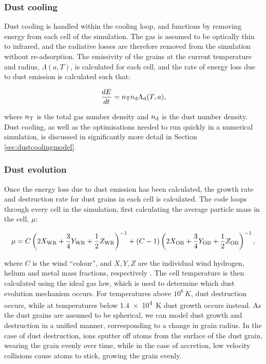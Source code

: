\subsubsection{Dust cooling}

Dust cooling is handled within the cooling loop, and functions by removing energy from each cell of the simulation.
The gas is assumed to be optically thin to infrared, and the radiative losses are therefore removed from the simulation without re-adsorption.
The emissivity of the grains at the current temperature and radius, $\Lambda(a,T)$, is calculated for each cell, and the rate of energy loss due to dust emission is calculated such that:

\begin{equation}
  \frac{dE}{dt} = n_\text{T} n_\text{d} \Lambda_\text{d}(T,a),
\end{equation}

\noindent
where $n_\text{T}$ is the total gas number density and $n_\text{d}$ is the dust number density.
Dust cooling, as well as the optimisations needed to run quickly in a numerical simulation, is discussed in significantly more detail in Section \ref{sec:dustcoolingmodel}.

\subsubsection{Dust evolution}

Once the energy loss due to dust emission has been calculated, the growth rate and destruction rate for dust grains in each cell is calculated.
The code loops through every cell in the simulation, first calculating the average particle mass in the cell, $\mu$:

\begin{equation}
  \mu = C \left(2 X_\text{WR} + \frac{3}{4} Y_\text{WR} + \frac{1}{2} Z_\text{WR} \right)^{-1} + (C-1) \left(2 X_\text{OB} + \frac{3}{4} Y_\text{OB} + \frac{1}{2} Z_\text{OB} \right)^{-1} ,
\end{equation}

\noindent
where $C$ is the wind ``colour'', and $X,Y,Z$ are the individual wind hydrogen, helium and metal mass fractions, respectively
\parencite{mihalasStellarAtmospheres1978}.
The cell temperature is then calculated using the ideal gas law, which is used to determine which dust evolution mechanism occurs.
For temperatures above $10^6 \, \si{K}$, dust destruction occurs, while at temperatures below \SI{1.4e4}{K} dust growth occurs instead.
As the dust grains are assumed to be spherical, we can model dust growth and destruction in a unified manner, corresponding to a change in grain radius.
In the case of dust destruction, ions sputter off atoms from the surface of the dust grain, wearing the grain evenly over time, while in the case of accretion, low velocity collisions cause atoms to stick, growing the grain evenly.

